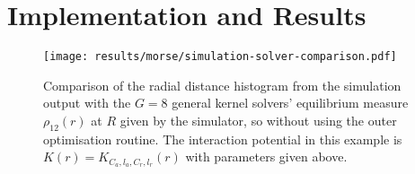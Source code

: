 \chapter{Implementation and Results}
\label{chap:implementation-and-results}

% 

\begin{figure}[H]
  \centering
  \label{fig:simulation-solver-comparison}
  \texttt{[image: results/morse/simulation-solver-comparison.pdf]}
  \caption[Comparison of histogram and spectral method solution]{Comparison of the radial distance histogram from the simulation output with the $G = 8$ general kernel solvers' equilibrium measure $\rho_{12}(r)$ at $R$ given by the simulator, so without using the outer optimisation routine. The interaction potential in this example is $K(r) = K_{C_a, l_a, C_r, l_r}(r)$ with parameters given above.}
\end{figure}
